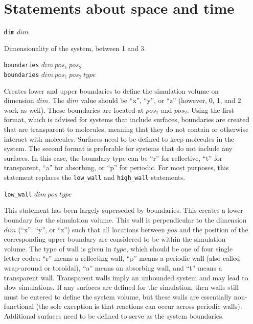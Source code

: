 \documentclass {scrbook}
\newcommand {\ttt} {\texttt}
\begin{document}
\section{Statements about space and time}

\begin{description}

\item{\ttt{dim} $dim$}

Dimensionality of the system, between 1 and 3.

\item{\ttt{boundaries} $dim\ pos_1\ pos_2$\\
\ttt{boundaries} $dim\ pos_1\ pos_2\ type$}

Creates lower and upper boundaries to define the simulation volume on dimension $dim$. The $dim$ value should be ``x'', ``y'', or ``z'' (however, 0, 1, and 2 work as well). These boundaries are located at $pos_1$ and $pos_2$. Using the first format, which is advised for systems that include surfaces, boundaries are created that are transparent to molecules, meaning that they do not contain or otherwise interact with molecules. Surfaces need to be defined to keep molecules in the system. The second format is preferable for systems that do not include any surfaces. In this case, the boundary type can be ``r'' for reflective, ``t'' for transparent, ``a'' for absorbing, or ``p'' for periodic. For most purposes, this statement replaces the \ttt{low\_wall} and \ttt{high\_wall} statements.

\item{\ttt{low\_wall} $dim\ pos\ type$}

This statement has been largely superseded by boundaries. This creates a lower boundary for the simulation volume. This wall is perpendicular to the dimension $dim$ (``x'', ``y'', or ``z'') such that all locations between $pos$ and the position of the corresponding upper boundary are considered to be within the simulation volume. The type of wall is given in $type$, which should be one of four single letter codes: ``r'' means a reflecting wall, ``p'' means a periodic wall (also called wrap-around or toroidal), ``a'' means an absorbing wall, and ``t'' means a transparent wall. Transparent walls imply an unbounded system and may lead to slow simulations. If any surfaces are defined for the simulation, then walls still must be entered to define the system volume, but these walls are essentially non-functional (the sole exception is that reactions can occur across periodic walls). Additional surfaces need to be defined to serve as the system boundaries.


\end{description}
\end{document}
